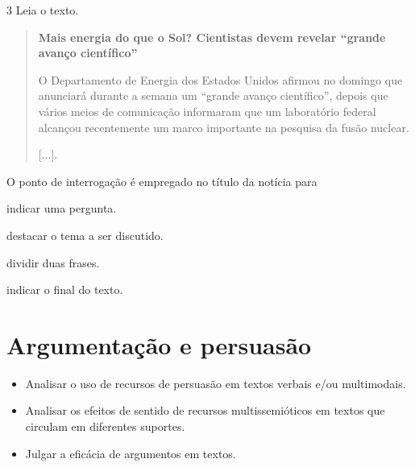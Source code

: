 \pagebreak
\num{3} Leia o texto.

\begin{quote}
\textbf{Mais energia do que o Sol? Cientistas devem revelar “grande
avanço científico”}

O Departamento de Energia dos Estados Unidos afirmou no domingo que
anunciará durante a semana um “grande avanço científico”, depois que
vários meios de comunicação informaram que um laboratório federal
alcançou recentemente um marco importante na pesquisa da fusão nuclear.

{[}...{]}.

\end{quote}

O ponto de interrogação é empregado no título da notícia para

\begin{minipage}{.5\textwidth}
\begin{escolha}
\item indicar uma pergunta.

\item destacar o tema a ser discutido.

\item dividir duas frases.

\item indicar o final do texto.
\end{escolha}
\end{minipage}

\chapter{Argumentação e persuasão}


\begin{itemize}
\item Analisar o uso de recursos de persuasão em textos verbais e/ou
multimodais.

\item Analisar os efeitos de sentido de recursos multissemióticos em textos
que circulam em diferentes suportes.

\item Julgar a eficácia de argumentos em textos.
\end{itemize}
	
